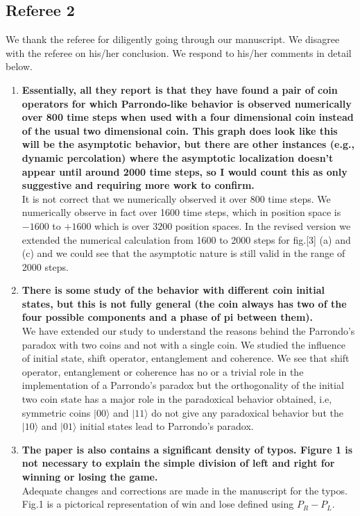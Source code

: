 \documentclass[10pt,a4paper]{article}
\begin{document}
\subsection*{Referee 2}
We thank the referee for diligently going through our manuscript. We disagree with the referee on his/her conclusion. We respond to his/her comments in detail below.
\begin{enumerate}
\item \textbf{Essentially, all they report is that they have found a pair of coin
operators for which Parrondo-like behavior is observed numerically
over 800 time steps when used with a four dimensional coin instead of
the usual two dimensional coin. This graph does look like this will be
the asymptotic behavior, but there are other instances (e.g., dynamic
percolation) where the asymptotic localization doesn't appear until
around 2000 time steps, so I would count this as only suggestive and
requiring more work to confirm.}\\
It is not correct that we numerically observed it over 800 time steps. We numerically observe in fact over 1600 time steps, which in position space is $-1600$ to $+1600$ which is over $3200$ position spaces.
In the revised version we extended the numerical calculation from 1600 to 2000 steps for fig.[3] (a) and (c) and we could see that the asymptotic nature is still valid in the range of 2000 steps.
\item \textbf{There is some study of the behavior
with different coin initial states, but this is not fully general (the
coin always has two of the four possible components and a phase of pi
between them).}\\
We have extended our study to understand the reasons behind the Parrondo's paradox with two coins and not with a single coin. We studied the influence of initial state, shift operator, entanglement and coherence. We see that shift operator, entanglement or coherence has no or a trivial role in the implementation of a Parrondo's paradox but the orthogonality of the initial two coin state has a major role in the paradoxical behavior obtained, i.e, symmetric coins $\vert 00 \rangle$ and $\vert 11 \rangle$ do not give any paradoxical behavior but the $\vert 10\rangle$ and $\vert 01 \rangle$ initial states lead to Parrondo's paradox.
\item \textbf{The paper is also contains a significant density of typos. Figure 1 is
not necessary to explain the simple division of left and right for winning or losing the game.}\\
Adequate changes and corrections are made in the manuscript for the typos. Fig.1 is a pictorical representation of win and lose defined using $P_R-P_L$.
 

\end{enumerate}
\end{document}
